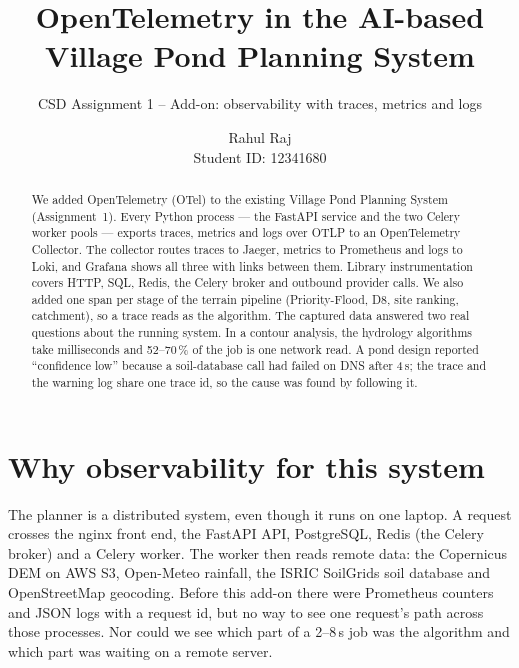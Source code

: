 \documentclass[manuscript,screen,review]{acmart}
\begin{document}
\title{OpenTelemetry in the AI-based Village Pond Planning System}
\subtitle{CSD Assignment 1 -- Add-on: observability with traces, metrics and logs}

\author{Rahul Raj\protect\\ \protect\normalfont\protect\small Student ID: 12341680}
\renewcommand{\shortauthors}{Rahul Raj}

\begin{abstract}
We added OpenTelemetry (OTel) to the existing Village Pond Planning System (Assignment~1).
Every Python process --- the FastAPI service and the two Celery worker pools --- exports
traces, metrics and logs over OTLP to an OpenTelemetry Collector. The collector routes
traces to Jaeger, metrics to Prometheus and logs to Loki, and Grafana shows all three
with links between them. Library instrumentation covers HTTP, SQL, Redis, the Celery
broker and outbound provider calls. We also added one span per stage of the terrain
pipeline (Priority-Flood, D8, site ranking, catchment), so a trace reads as the algorithm.
The captured data answered two real questions about the running system. In a contour
analysis, the hydrology algorithms take milliseconds and 52--70\,\% of the job is one
network read. A pond design reported ``confidence low'' because a soil-database call had
failed on DNS after 4\,s; the trace and the warning log share one trace id, so the cause
was found by following it.
\end{abstract}

\maketitle

\section{Why observability for this system}
The planner is a distributed system, even though it runs on one laptop. A request crosses
the nginx front end, the FastAPI API, PostgreSQL, Redis (the Celery broker) and a Celery
worker. The worker then reads remote data: the Copernicus DEM on AWS S3, Open-Meteo
rainfall, the ISRIC SoilGrids soil database and OpenStreetMap geocoding. Before this
add-on there were Prometheus counters and JSON logs with a request id, but no way to see
one request's path across those processes. Nor could we see which part of a 2--8\,s job
was the algorithm and which part was waiting on a remote server.
\end{document}
